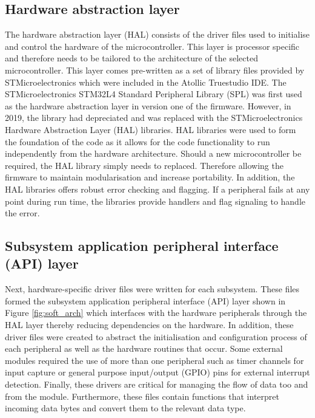 \subsection{Hardware abstraction layer}
\label{subsec:ch5_hal}
The hardware abstraction layer (HAL) consists of the driver files used to initialise and control the hardware of the microcontroller. This layer is processor specific and therefore needs to be tailored to the architecture of the selected microcontroller. This layer comes pre-written as a set of library files provided by STMicroelectronics which were included in the Atollic Truestudio IDE. The STMicroelectronics STM32L4 Standard Peripheral Library (SPL) was first used as the hardware abstraction layer in version one of the firmware. However, in 2019, the library had depreciated and was replaced with the STMicroelectronics Hardware Abstraction Layer (HAL) libraries. HAL libraries were used to form the foundation of the code as it allows for the code functionality to run independently from the hardware architecture. Should a new microcontroller be required, the HAL library simply needs to replaced. Therefore allowing the firmware to maintain modularisation and increase portability. In addition, the HAL libraries offers robust error checking and flagging. If a peripheral fails at any point during run time, the libraries provide handlers and flag signaling to handle the error.

\subsection{Subsystem application peripheral interface (API) layer}

Next, hardware-specific driver files were written for each subsystem. These files formed the subsystem application peripheral interface (API) layer shown in Figure \ref{fig:soft_arch} which interfaces with the hardware peripherals through the HAL layer thereby reducing dependencies on the hardware. In addition, these driver files were created to abstract the initialisation and configuration process of each peripheral as well as the hardware routines that occur. Some external modules required the use of more than one peripheral such as timer channels for input capture or general purpose input/output (GPIO) pins for external interrupt detection. Finally, these drivers are critical for managing the flow of data too and from the module. Furthermore, these files contain functions that interpret incoming data bytes and convert them to the relevant data type.

